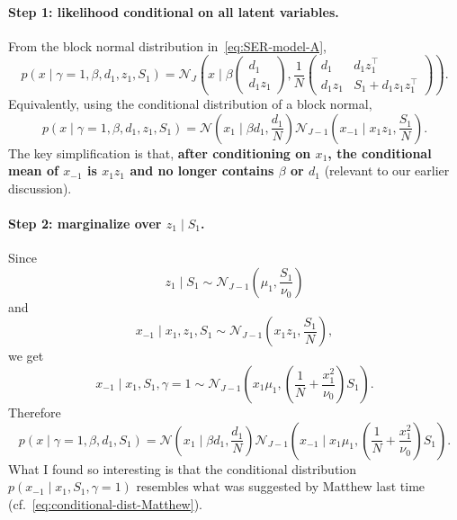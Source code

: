 \documentclass[11pt]{article}
\newcommand{\Normal}{\mathcal N}
\begin{document}
\paragraph{Step 1: likelihood conditional on all latent variables.}
From the block normal distribution in~\eqref{eq:SER-model-A},
\[
p(x\mid \gamma=1,\beta,d_1,z_1,S_1)
=
\Normal_J\left(
x\mid
\beta
\begin{pmatrix}
d_1\\ d_1z_1
\end{pmatrix},
\frac{1}{N}
\begin{pmatrix}
d_1 & d_1z_1^\top\\
d_1z_1 & S_1+d_1z_1z_1^\top
\end{pmatrix}
\right).
\]
Equivalently, using the conditional distribution of a block normal,
\[
p(x\mid \gamma=1,\beta,d_1,z_1,S_1)
=
\Normal\left(x_1\mid \beta d_1,\frac{d_1}{N}\right)
\Normal_{J-1}\left(x_{-1}\mid x_1z_1,\frac{S_1}{N}\right).
\]
The key simplification is that, \textbf{after conditioning on $x_1$, the conditional
mean of $x_{-1}$ is $x_1z_1$ and no longer contains $\beta$ or $d_1$} (relevant to our earlier discussion).

\paragraph{Step 2: marginalize over $z_1\mid S_1$.}
Since
\[
z_1\mid S_1\sim \Normal_{J-1}\left(\mu_1,\frac{S_1}{\nu_0}\right)
\]
and
\[
x_{-1}\mid x_1,z_1,S_1
\sim
\Normal_{J-1}\left(x_1z_1,\frac{S_1}{N}\right),
\]
we get
\begin{equation}\label{eq:conditional-dist-susie-love}
x_{-1}\mid x_1,S_1,\gamma=1
\sim
\Normal_{J-1}\left(
x_1\mu_1,
\left(\frac{1}{N}+\frac{x_1^2}{\nu_0}\right)S_1
\right).
\end{equation}
Therefore
\[
p(x\mid \gamma=1,\beta,d_1,S_1)
=
\Normal\left(x_1\mid \beta d_1,\frac{d_1}{N}\right)
\Normal_{J-1}\left(
x_{-1}\mid x_1\mu_1,
\left(\frac{1}{N}+\frac{x_1^2}{\nu_0}\right)S_1
\right).
\]
What I found so interesting is that the conditional distribution $p(x_{-1}\mid x_1,S_1,\gamma=1)$ resembles what was suggested by Matthew last time (cf.~\eqref{eq:conditional-dist-Matthew}).
\end{document}
